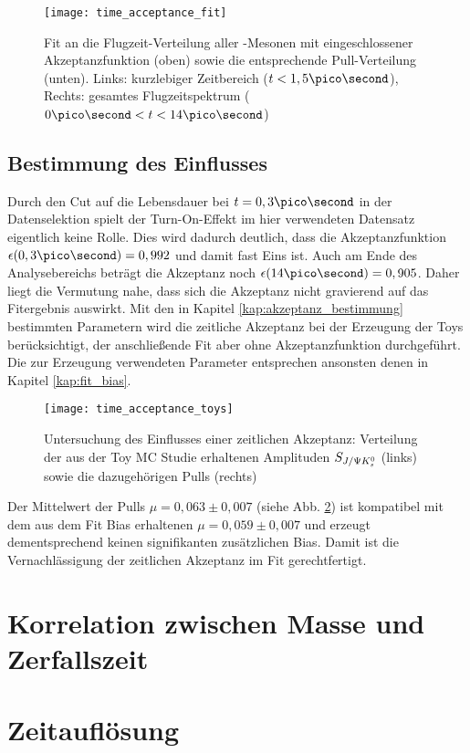 \begin{figure}[hptb]
\centering
\texttt{[image: time\_acceptance\_fit]}
\caption{Fit an die Flugzeit-Verteilung aller \Bd-Mesonen mit eingeschlossener Akzeptanzfunktion (oben) sowie die entsprechende Pull-Verteilung (unten). Links: kurzlebiger Zeitbereich ($t<1,5\pico\second$), Rechts: gesamtes Flugzeitspektrum ($0\ps < t < 14\ps$)}
\label{fig:fit_akzeptanz}
\end{figure}

\subsection{Bestimmung des Einflusses}
Durch den Cut auf die Lebensdauer bei $t = 0,3\ps$ in der Datenselektion spielt der Turn-On-Effekt im hier verwendeten Datensatz eigentlich keine Rolle. Dies wird dadurch deutlich, dass die Akzeptanzfunktion $\epsilon(0,3\ps) = 0,992$ und damit fast Eins ist. Auch am Ende des Analysebereichs beträgt die Akzeptanz noch $\epsilon(14\ps) = 0,905$. Daher liegt die Vermutung nahe, dass sich die Akzeptanz nicht gravierend auf das Fitergebnis auswirkt. Mit den in Kapitel \ref{kap:akzeptanz_bestimmung} bestimmten Parametern wird die zeitliche Akzeptanz bei der Erzeugung der Toys berücksichtigt, der anschließende Fit aber ohne Akzeptanzfunktion durchgeführt. Die zur Erzeugung verwendeten Parameter entsprechen ansonsten denen in Kapitel \ref{kap:fit_bias}.

\begin{figure}[hptb]
\centering
\texttt{[image: time\_acceptance\_toys]}
\caption{Untersuchung des Einflusses einer zeitlichen Akzeptanz: Verteilung der aus der Toy MC Studie erhaltenen Amplituden $S_{J/\Psi K_s^0}$ (links) sowie die dazugehörigen Pulls (rechts)}
\label{fig:toys_acceptance}
\end{figure}

Der Mittelwert der Pulls $\mu = 0,063 \pm 0,007$ (siehe Abb. \ref{fig:toys_acceptance}) ist kompatibel mit dem aus dem Fit Bias erhaltenen $\mu = 0,059 \pm 0,007$ und erzeugt dementsprechend keinen signifikanten zusätzlichen Bias. Damit ist die Vernachlässigung der zeitlichen Akzeptanz im Fit gerechtfertigt.



\section{Korrelation zwischen Masse und Zerfallszeit}

\section{Zeitauflösung}
